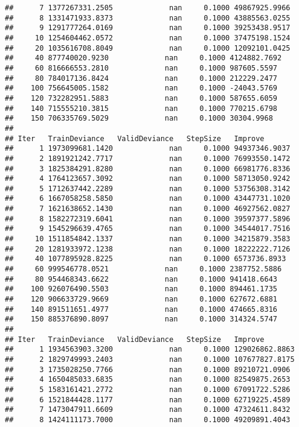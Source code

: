 \documentclass[
]{article}
\begin{document}
\begin{verbatim}
##      7 1377267331.2505             nan     0.1000 49867925.9966
##      8 1331471933.8373             nan     0.1000 43885563.0255
##      9 1291777264.0169             nan     0.1000 39253438.9517
##     10 1254604462.0572             nan     0.1000 37475198.1524
##     20 1035616708.8049             nan     0.1000 12092101.0425
##     40 877740020.9230             nan     0.1000 4124882.7692
##     60 816666553.2810             nan     0.1000 987605.5597
##     80 784017136.8424             nan     0.1000 212229.2477
##    100 756645005.1582             nan     0.1000 -24043.5769
##    120 732282951.5883             nan     0.1000 587655.6059
##    140 715555210.3815             nan     0.1000 770215.6798
##    150 706335769.5029             nan     0.1000 30304.9968
## 
## Iter   TrainDeviance   ValidDeviance   StepSize   Improve
##      1 1973099681.1420             nan     0.1000 94937346.9037
##      2 1891921242.7717             nan     0.1000 76993550.1472
##      3 1825384291.8280             nan     0.1000 66981776.8336
##      4 1764123657.3092             nan     0.1000 58713050.9242
##      5 1712637442.2289             nan     0.1000 53756308.3142
##      6 1667058258.5850             nan     0.1000 43447731.1020
##      7 1621638652.1430             nan     0.1000 46927562.0827
##      8 1582272319.6041             nan     0.1000 39597377.5896
##      9 1545296639.4765             nan     0.1000 34544017.7516
##     10 1511854842.1337             nan     0.1000 34215879.3583
##     20 1281933972.1238             nan     0.1000 18222222.7126
##     40 1077895928.8225             nan     0.1000 6573736.8933
##     60 999546778.0521             nan     0.1000 2387752.5886
##     80 954468343.6622             nan     0.1000 941418.6643
##    100 926076490.5503             nan     0.1000 894461.1735
##    120 906633729.9669             nan     0.1000 627672.6881
##    140 891511651.4977             nan     0.1000 474665.8316
##    150 885376890.8097             nan     0.1000 314324.5747
## 
## Iter   TrainDeviance   ValidDeviance   StepSize   Improve
##      1 1934563903.3200             nan     0.1000 129026862.8863
##      2 1829749993.2403             nan     0.1000 107677827.8175
##      3 1735028250.7766             nan     0.1000 89210721.0906
##      4 1650485033.6835             nan     0.1000 82549875.2653
##      5 1583161421.2772             nan     0.1000 67091722.5286
##      6 1521844428.1177             nan     0.1000 62719225.4589
##      7 1473047911.6609             nan     0.1000 47324611.8432
##      8 1424111173.7000             nan     0.1000 49209891.4043

\end{verbatim}
\end{document}
